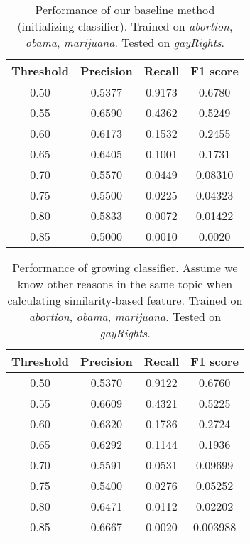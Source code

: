 \documentclass[11pt,a4paper]{article}
\begin{document}
\begin{table*}[h]
\begin{center}
\begin{tabular}{|c||c|c|c|}
\hline \bf Threshold & \bf Precision & \bf Recall &\bf F1 score \\ \hline\hline
0.50& 0.5377    & 0.9173 & 0.6780 \\
0.55& 0.6590    & 0.4362 & 0.5249 \\
0.60& 0.6173    & 0.1532 & 0.2455 \\
0.65& 0.6405    & 0.1001 & 0.1731 \\
0.70& 0.5570    & 0.0449 & 0.08310 \\
0.75& 0.5500    & 0.0225 & 0.04323 \\
0.80& 0.5833    & 0.0072 & 0.01422 \\
0.85& 0.5000    & 0.0010 & 0.0020 \\ 
\hline
\end{tabular}
\end{center}
\caption{\label{tab:ic} Performance of our baseline method (initializing classifier). Trained on {\it abortion}, {\it obama}, {\it marijuana}. Tested on {\it gayRights}.}
\end{table*}

\begin{table*}[h]
\begin{center}
\begin{tabular}{|c||c|c|c|}
\hline \bf Threshold & \bf Precision & \bf Recall &\bf F1 score \\ \hline\hline
0.50 & 0.5370 & 0.9122 & 0.6760\\
0.55 & 0.6609 & 0.4321 & 0.5225 \\
0.60 & 0.6320 & 0.1736 & 0.2724 \\
0.65 & 0.6292 & 0.1144 & 0.1936 \\
0.70 & 0.5591 & 0.0531 & 0.09699 \\
0.75 & 0.5400 & 0.0276 & 0.05252 \\
0.80 & 0.6471 & 0.0112 & 0.02202 \\
0.85 & 0.6667 & 0.0020 & 0.003988 \\
\hline
\end{tabular}
\end{center}
\caption{\label{tab:gc} Performance of growing classifier. Assume we know other reasons in the same topic when calculating similarity-based feature. Trained on {\it abortion}, {\it obama}, {\it marijuana}. Tested on {\it gayRights}.}
\end{table*}
\end{document}
